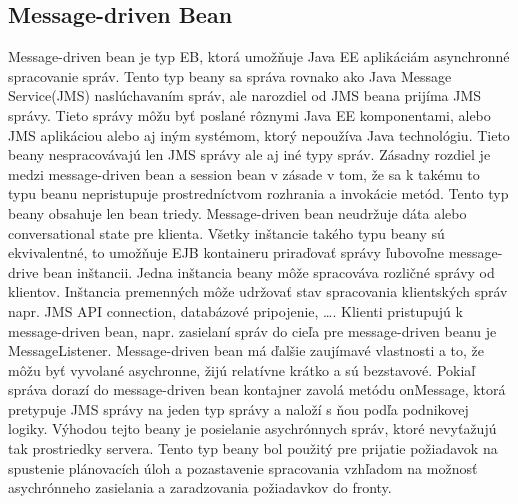 \subsection{Message-driven Bean}
Message-driven bean je typ EB, ktorá umožňuje Java EE aplikáciám asynchronné spracovanie správ. Tento typ beany sa správa rovnako ako Java Message Service(JMS)\cite{messagebook} naslúchavaním správ, ale narozdiel od JMS beana prijíma JMS správy. Tieto správy môžu byť poslané rôznymi Java EE komponentami, alebo JMS aplikáciou alebo aj iným systémom, ktorý nepoužíva Java technológiu. Tieto beany nespracovávajú len JMS správy ale aj iné typy správ. Zásadny rozdiel je medzi message-driven bean a session bean v zásade v tom, že sa k takému to typu beanu nepristupuje prostredníctvom rozhrania a invokácie metód. Tento typ beany obsahuje len bean triedy. Message-driven bean neudržuje dáta alebo conversational state pre klienta. Všetky inštancie takého typu beany sú ekvivalentné, to umožňuje EJB kontaineru priraďovať správy ľubovoľne message-drive bean inštancii. Jedna inštancia beany môže spracováva rozličné správy od klientov. Inštancia premenných môže udržovať stav spracovania klientských správ napr. JMS API connection, databázové pripojenie, \ldots. Klienti pristupujú k message-driven bean, napr. zasielaní správ do cieľa pre message-driven beanu je MessageListener. Message-driven bean má ďalšie zaujímavé vlastnosti a to, že môžu byť vyvolané asychronne, žijú relatívne krátko a sú bezstavové. Pokiaľ správa dorazí do message-driven bean kontajner zavolá metódu onMessage, ktorá pretypuje JMS správy na jeden typ správy a naloží s ňou podľa podnikovej logiky.  Výhodou tejto beany je posielanie asychrónnych správ, ktoré nevyťažujú tak prostriedky servera. Tento typ beany bol použitý pre prijatie požiadavok na spustenie plánovacích úloh a pozastavenie spracovania vzhľadom na možnosť asychrónneho zasielania a zaradzovania požiadavkov do fronty.



